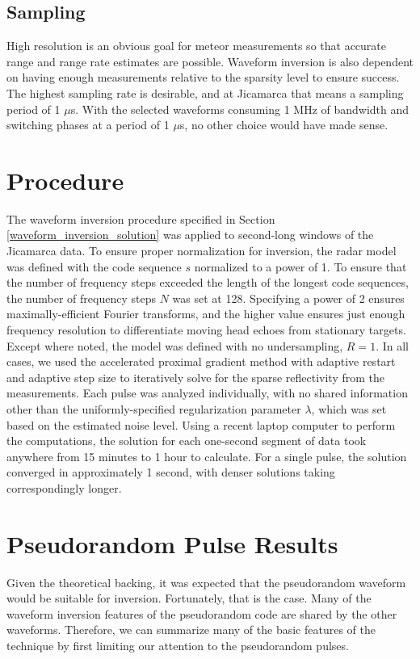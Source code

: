 \subsection{Sampling}
High resolution is an obvious goal for meteor measurements so that accurate range and range rate estimates are possible. Waveform inversion is also dependent on having enough measurements relative to the sparsity level to ensure success. The highest sampling rate is desirable, and at Jicamarca that means a sampling period of 1 $\mu$s. With the selected waveforms consuming 1 MHz of bandwidth and switching phases at a period of 1 $\mu$s, no other choice would have made sense.

\section{Procedure}
\label{waveform_inversion_procedure}
The waveform inversion procedure specified in Section \ref{waveform_inversion_solution} was applied to second-long windows of the Jicamarca data. To ensure proper normalization for inversion, the radar model was defined with the code sequence $s$ normalized to a power of 1. To ensure that the number of frequency steps exceeded the length of the longest code sequences, the number of frequency steps $N$ was set at 128. Specifying a power of 2 ensures maximally-efficient Fourier transforms, and the higher value ensures just enough frequency resolution to differentiate moving head echoes from stationary targets. Except where noted, the model was defined with no undersampling, $R=1$. In all cases, we used the accelerated proximal gradient method with adaptive restart and adaptive step size to iteratively solve for the sparse reflectivity from the measurements. Each pulse was analyzed individually, with no shared information other than the uniformly-specified regularization parameter $\lambda$, which was set based on the estimated noise level. Using a recent laptop computer to perform the computations, the solution for each one-second segment of data took anywhere from 15 minutes to 1 hour to calculate. For a single pulse, the solution converged in approximately 1 second, with denser solutions taking correspondingly longer.

\section{Pseudorandom Pulse Results}
\label{pseudorandom_results}
Given the theoretical backing, it was expected that the pseudorandom waveform would be suitable for inversion. Fortunately, that is the case. Many of the waveform inversion features of the pseudorandom code are shared by the other waveforms. Therefore, we can summarize many of the basic features of the technique by first limiting our attention to the pseudorandom pulses.

